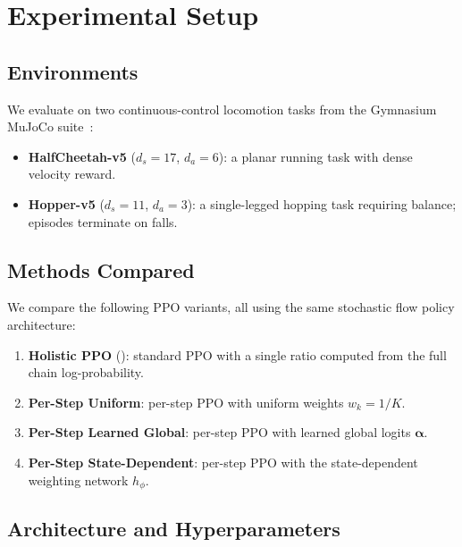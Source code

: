 \section{Experimental Setup}
\label{sec:experiments}

\subsection{Environments}
\label{sec:experiments:envs}

We evaluate on two continuous-control locomotion tasks from the Gymnasium
MuJoCo suite~\citep{towers2024gymnasium}:
\begin{itemize}[nosep,leftmargin=*]
  \item \textbf{HalfCheetah-v5} ($d_s{=}17$, $d_a{=}6$): a planar running
        task with dense velocity reward.
  \item \textbf{Hopper-v5} ($d_s{=}11$, $d_a{=}3$): a single-legged hopping
        task requiring balance; episodes terminate on falls.
\end{itemize}

\subsection{Methods Compared}
\label{sec:experiments:methods}

We compare the following PPO variants, all using the same stochastic flow
policy architecture:
\begin{enumerate}[nosep,leftmargin=*]
  \item \textbf{Holistic PPO} (): standard PPO with
        a single ratio computed from the full chain log-probability.
  \item \textbf{Per-Step Uniform}: per-step PPO with uniform weights
        $w_k = 1/K$.
  \item \textbf{Per-Step Learned Global}: per-step PPO with learned global
        logits $\boldsymbol{\alpha}$.
  \item \textbf{Per-Step State-Dependent}: per-step PPO with the
        state-dependent weighting network $h_\phi$.
\end{enumerate}

\subsection{Architecture and Hyperparameters}
\label{sec:experiments:hyperparams}

